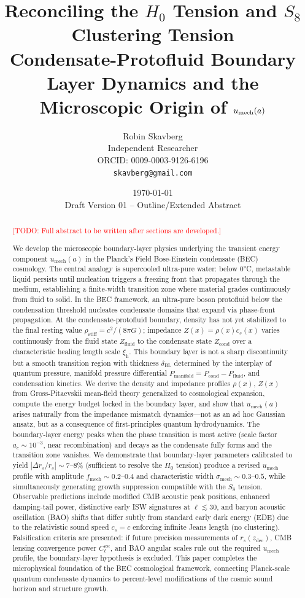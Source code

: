 \documentclass[11pt,a4paper]{article}
\title{\textbf{Reconciling the $H_0$ Tension and $S_8$ Clustering Tension}\\[0.5em]
\large Condensate-Protofluid Boundary Layer Dynamics and the Microscopic Origin of $\umech(a)$}
\author{Robin Skavberg\\[0.3em]
\small Independent Researcher\\
\small ORCID: 0009-0003-9126-6196\\
\small \texttt{skavberg@gmail.com}}
\date{\today\\[0.5em]
\small Draft Version 01 -- Outline/Extended Abstract}
\newcommand{\rhostiff}{\ensuremath{\rho_{\mathrm{stiff}}}}
\newcommand{\umech}{\ensuremath{u_{\mathrm{mech}}}}
\newcommand{\fmech}{\ensuremath{f_{\mathrm{mech}}}}
\newcommand{\ac}{\ensuremath{a_c}}
\newcommand{\sigmamech}{\ensuremath{\sigma_{\mathrm{mech}}}}
\newcommand{\zdec}{\ensuremath{z_{\mathrm{dec}}}}
\newcommand{\rs}{\ensuremath{r_s}}
\newcommand{\Zfluid}{\ensuremath{Z_{\mathrm{fluid}}}}
\newcommand{\Zcond}{\ensuremath{Z_{\mathrm{cond}}}}
\newcommand{\Pmanifold}{\ensuremath{P_{\mathrm{manifold}}}}
\newcommand{\Pfluid}{\ensuremath{P_{\mathrm{fluid}}}}
\newcommand{\Pcond}{\ensuremath{P_{\mathrm{cond}}}}
\newcommand{\xih}{\ensuremath{\xi_{\mathrm{h}}}}
\newcommand{\deltaBL}{\ensuremath{\delta_{\mathrm{BL}}}}
\theoremstyle{definition}
\theoremstyle{remark}
\begin{document}
\maketitle

\begin{abstract}
\textcolor{red}{[TODO: Full abstract to be written after sections are developed.]}

We develop the microscopic boundary-layer physics underlying the transient energy component $\umech(a)$ in the Planck's Field Bose-Einstein condensate (BEC) cosmology. The central analogy is supercooled ultra-pure water: below 0°C, metastable liquid persists until nucleation triggers a freezing front that propagates through the medium, establishing a finite-width transition zone where material grades continuously from fluid to solid. In the BEC framework, an ultra-pure boson protofluid below the condensation threshold nucleates condensate domains that expand via phase-front propagation. At the condensate-protofluid boundary, density has not yet stabilized to the final resting value $\rhostiff = c^2/(8\pi G)$; impedance $Z(x) = \rho(x) c_s(x)$ varies continuously from the fluid state $\Zfluid$ to the condensate state $\Zcond$ over a characteristic healing length scale $\xih$. This boundary layer is not a sharp discontinuity but a smooth transition region with thickness $\deltaBL$ determined by the interplay of quantum pressure, manifold pressure differential $\Pmanifold = \Pcond - \Pfluid$, and condensation kinetics. We derive the density and impedance profiles $\rho(x)$, $Z(x)$ from Gross-Pitaevskii mean-field theory generalized to cosmological expansion, compute the energy budget locked in the boundary layer, and show that $\umech(a)$ arises naturally from the impedance mismatch dynamics---not as an ad hoc Gaussian ansatz, but as a consequence of first-principles quantum hydrodynamics. The boundary-layer energy peaks when the phase transition is most active (scale factor $\ac \sim 10^{-3}$, near recombination) and decays as the condensate fully forms and the transition zone vanishes. We demonstrate that boundary-layer parameters calibrated to yield $|\Delta\rs/\rs| \sim 7$--$8\%$ (sufficient to resolve the $H_0$ tension) produce a revised $\umech$ profile with amplitude $\fmech \sim 0.2$--$0.4$ and characteristic width $\sigmamech \sim 0.3$--$0.5$, while simultaneously generating growth suppression compatible with the $S_8$ tension. Observable predictions include modified CMB acoustic peak positions, enhanced damping-tail power, distinctive early ISW signatures at $\ell \lesssim 30$, and baryon acoustic oscillation (BAO) shifts that differ subtly from standard early dark energy (EDE) due to the relativistic sound speed $c_s = c$ enforcing infinite Jeans length (no clustering). Falsification criteria are presented: if future precision measurements of $r_s(\zdec)$, CMB lensing convergence power $C_\ell^{\kappa\kappa}$, and BAO angular scales rule out the required $\umech$ profile, the boundary-layer hypothesis is excluded. This paper completes the microphysical foundation of the BEC cosmological framework, connecting Planck-scale quantum condensate dynamics to percent-level modifications of the cosmic sound horizon and structure growth.
\end{abstract}
\end{document}
